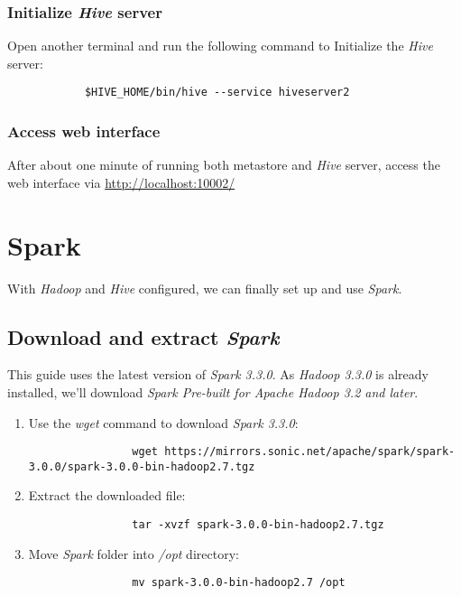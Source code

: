 \documentclass{article}
\begin{document}
        \subsubsection{Initialize \emph{Hive} server}
        Open another terminal and run the following command to Initialize the \emph{Hive} server:
        \begin{verbatim}
            $HIVE_HOME/bin/hive --service hiveserver2
        \end{verbatim}

        \subsubsection{Access web interface}
        After about one minute of running both metastore and \emph{Hive} server, access the web
        interface via \url{http://localhost:10002/}

\section{Spark}
With \emph{Hadoop} and \emph{Hive} configured, we can finally set up and use \emph{Spark}.

        \subsection{Download and extract \emph{Spark}}
        This guide uses the latest version of \emph{Spark 3.3.0}. As \emph{Hadoop 3.3.0} is
        already installed, we'll download \emph{Spark Pre-built for Apache Hadoop 3.2 and later}.
        \begin{enumerate}
            \item Use the \emph{wget} command to download \emph{Spark 3.3.0}:
            \begin{verbatim}
                wget https://mirrors.sonic.net/apache/spark/spark-3.0.0/spark-3.0.0-bin-hadoop2.7.tgz
            \end{verbatim}

            \item Extract the downloaded file:
            \begin{verbatim}
                tar -xvzf spark-3.0.0-bin-hadoop2.7.tgz
            \end{verbatim}

            \item Move \emph{Spark} folder into \emph{/opt} directory:
            \begin{verbatim}
                mv spark-3.0.0-bin-hadoop2.7 /opt
            \end{verbatim}
        \end{enumerate}
\end{document}

